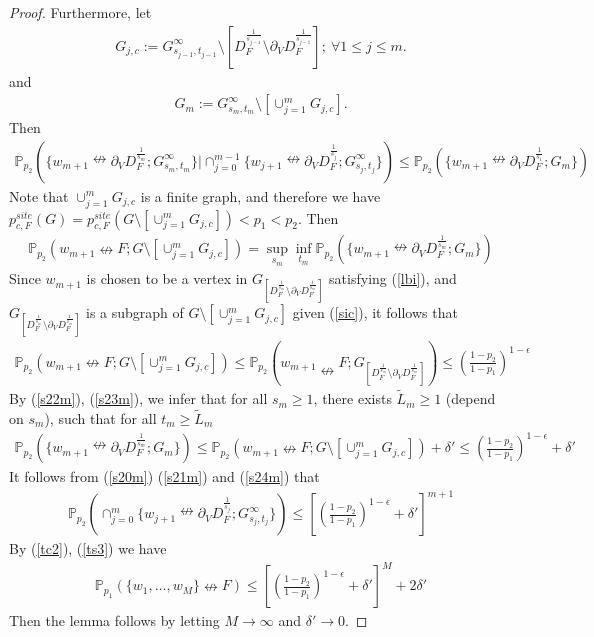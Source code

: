 \documentclass[11pt]{amsart}
\theoremstyle{plain}
\numberwithin{equation}{section}
\numberwithin{figure}{section}
\newcommand\PP{{\mathbb P}}
\begin{document}
\begin{proof}
Furthermore, let
\begin{align*}
G_{j,c}:=G_{s_{j-1},t_{j-1}}^{\infty}\setminus [D_F^{\frac{1}{s_{j-1}}}\setminus \partial_V D_F^{\frac{1}{s_{j-1}}}];\ \forall 1\leq j\leq m.
\end{align*}
and
\begin{align*}
G_m:=G_{s_m,t_m}^{\infty}\setminus[\cup_{j=1}^m G_{j,c}].
\end{align*}
Then
\begin{align}
\PP_{p_2}(\{w_{m+1}\nleftrightarrow \partial_V D_F^{\frac{1}{s_m}};G_{s_m,t_m}^{\infty}\}|\cap_{j=0}^{m-1}\{w_{j+1}\nleftrightarrow \partial_V D_F^{\frac{1}{s_j}};G_{s_j,t_j}^{\infty}\})\leq \PP_{p_2}(\{w_{m+1}\nleftrightarrow \partial_V D_F^{\frac{1}{s_1}};G_m\})\label{s21m}
\end{align}
Note that $\cup_{j=1}^mG_{j,c}$ is a finite graph, and therefore we have $p_{c,F}^{site}(G)=p_{c,F}^{site}(G\setminus [\cup_{j=1}^mG_{j,c}])<p_1<p_2$. Then
\begin{align}
\PP_{p_2}(w_{m+1}\nleftrightarrow F; G\setminus [\cup_{j=1}^m G_{j,c}])=
\sup_{s_m}\inf_{t_m}\PP_{p_2}(\{w_{m+1}\nleftrightarrow \partial_V D_F^{\frac{1}{s_m}};G_m\})\label{s22m}
\end{align}
Since $w_{m+1}$ is chosen to be a vertex in $G_{\left[D_{F}^{\frac{1}{s_m}}\setminus \partial_VD_{F}^{\frac{1}{s_m}}\right]}$ satisfying (\ref{lbi}), and $G_{\left[D_{F}^{\frac{1}{s_m}}\setminus \partial_VD_{F}^{\frac{1}{s_m}}\right]}$ is a subgraph of $G\setminus [\cup_{j=1}^mG_{j,c}]$ given (\ref{sic}), it follows that 
\begin{align}
\PP_{p_2}(w_{m+1}\nleftrightarrow F; G\setminus [\cup_{j=1}^mG_{j,c}])\leq \PP_{p_2}\left(w_{m+1}\nleftrightarrow F; G_{\left[D_{F}^{\frac{1}{s_m}}\setminus \partial_VD_{F}^{\frac{1}{s_m}}\right]}\right)\leq\left(\frac{1-p_2}{1-p_1}\right)^{1-\epsilon}\label{s23m}
\end{align}
By (\ref{s22m}), (\ref{s23m}), we infer that for all $s_m\geq 1$, there exists $\tilde{L}_m\geq 1$ (depend on $s_m$), such that for all $t_m\geq \tilde{L}_m$
\begin{align}
 \PP_{p_2}(\{w_{m+1}\nleftrightarrow \partial_V D_F^{\frac{1}{s_m}};G_m\})\le \PP_{p_2}(w_{m+1}\nleftrightarrow F;G\setminus [\cup_{j=1}^mG_{j,c}])+\delta'\leq \left(\frac{1-p_2}{1-p_1}\right)^{1-\epsilon}+\delta'\label{s24m}
\end{align}
It follows from (\ref{s20m}) (\ref{s21m}) and (\ref{s24m}) that
\begin{align}
\PP_{p_2}(\cap_{j=0}^{m}\{w_{j+1}\nleftrightarrow \partial_V D_F^{\frac{1}{s_j}};G_{s_j,t_j}^{\infty}\})\leq \left[\left(\frac{1-p_2}{1-p_1}\right)^{1-\epsilon}+\delta'\right]^{m+1}\label{ts3}
\end{align}
By (\ref{tc2}), (\ref{ts3}) we have
\begin{align*}
\PP_{p_1}(\{w_1,\ldots,w_M\}\nleftrightarrow F)\leq\left[\left(\frac{1-p_2}{1-p_1}\right)^{1-\epsilon}+\delta'\right]^{M}+2\delta' 
\end{align*}
Then the lemma follows by letting $M\rightarrow\infty$ and $\delta'\rightarrow 0$.
\end{proof}
\end{document}
